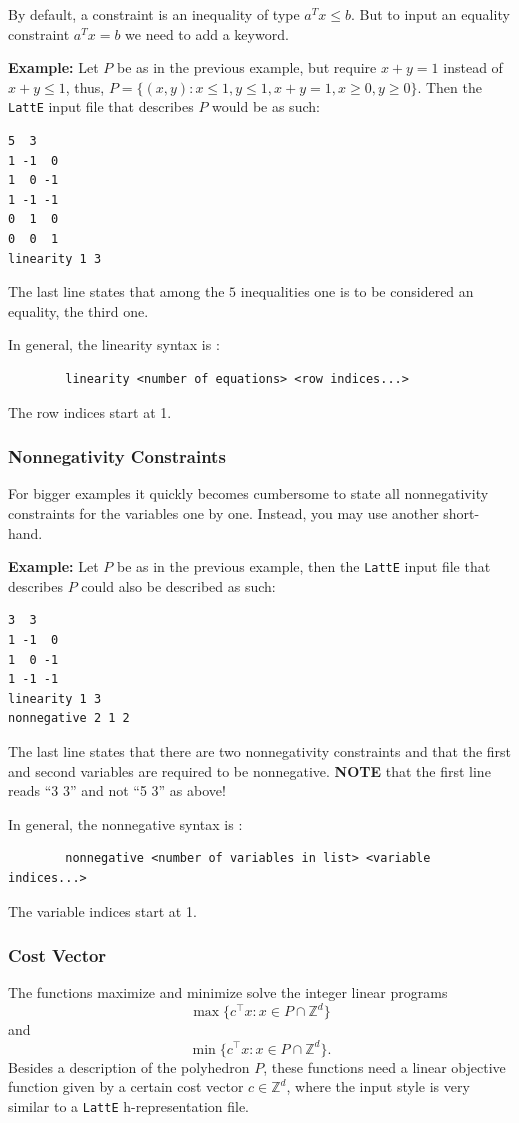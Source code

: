 \documentclass{article}
\newcommand{\Z}{{\mathbb Z}}
\newcommand{\latte}{{\tt LattE}\xspace}
\newcommand{\example}{{\bf Example:\space}}
\begin{document}
By default, a constraint is an inequality of type $a^Tx\leq b$. But to input an equality constraint $a^Tx=b$ we need to add a keyword.

\example
Let $P$ be as in the previous example, but require $x+y=1$ instead of
$x+y\leq 1$, thus, 
$P=\{(x,y): x\leq 1, y\leq 1, x+y=1, x\geq 0, y\geq 0\}$.
Then the {\tt LattE} input file that describes $P$ would be as such:
\begin{verbatim}
5  3
1 -1  0
1  0 -1
1 -1 -1
0  1  0
0  0  1
linearity 1 3
\end{verbatim}
The last line states that among the $5$ inequalities one is to be
considered an equality, the third one.

In general, the linearity syntax is :
\begin{verbatim}
        linearity <number of equations> <row indices...>
\end{verbatim}
The row indices start at 1.

\subsubsection{Nonnegativity Constraints}
For bigger examples it quickly becomes cumbersome to state all
nonnegativity constraints for the variables one by one. Instead, you
may use another short-hand.

\example
Let $P$ be as in the previous example, then the {\tt LattE} input file
that describes $P$ could also be described as such: 
\begin{verbatim}
3  3
1 -1  0
1  0 -1
1 -1 -1
linearity 1 3
nonnegative 2 1 2
\end{verbatim}
The last line states that there are two nonnegativity constraints and
that the first and second variables are required to be nonnegative. 
{\bf NOTE} that the first line reads ``3 3'' and not ``5 3'' as above! 

In general, the nonnegative syntax is :
\begin{verbatim}
        nonnegative <number of variables in list> <variable indices...>
\end{verbatim}
The variable indices start at 1.


\subsubsection{Cost Vector}
The functions maximize and minimize solve the integer linear programs
\[
\max\{c^\intercal x: x\in P\cap\Z^d\}
\]
and
\[
\min\{c^\intercal x: x\in P\cap\Z^d\}.
\]
Besides a description of the polyhedron $P$, these functions need a
linear objective function given by a certain cost vector $c \in \Z^d$, where the input style is very similar to a \latte h-representation file. 
\end{document}
